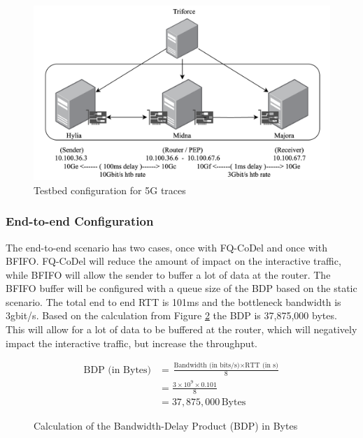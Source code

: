 \documentclass[a4paper,english, 11pt]{report}
\begin{document}
\begin{figure}[!h!] %
	\centering
	\includegraphics[scale=0.60]{../diagrams/drawio/testbed2.png}
  	\caption{Testbed configuration for 5G traces}
  	\label{fig:testbed2}
\end{figure}

\subsubsection{End-to-end Configuration}
The end-to-end scenario has two cases, once with FQ-CoDel and once with BFIFO. FQ-CoDel will reduce the amount of impact on the interactive traffic, while BFIFO will allow the sender to buffer a lot of data at the router. The BFIFO buffer will be configured with a queue size of the BDP based on the static scenario. The total end to end RTT is 101ms and the bottleneck bandwidth is 3gbit/s. Based on the calculation from Figure \ref{eq:bdp_calculation} the BDP is 37,875,000 bytes. This will allow for a lot of data to be buffered at the router, which will negatively impact the interactive traffic, but increase the throughput.\\

\begin{figure}[ht]
\centering
\begin{equation}
\begin{aligned}
\text{BDP (in Bytes)} &= \frac{\text{Bandwidth (in bits/s)} \times \text{RTT (in s)}}{8} \\
&= \frac{3 \times 10^9 \times 0.101}{8} \\
&= 37,875,000 \, \text{Bytes}
\end{aligned}
\end{equation}
\caption{Calculation of the Bandwidth-Delay Product (BDP) in Bytes}
\label{eq:bdp_calculation}
\end{figure}
\end{document}
